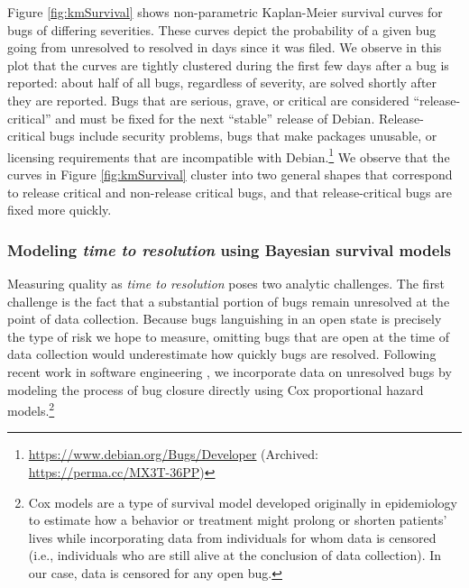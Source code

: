 \documentclass[10pt,conference]{IEEEtran}\usepackage[]{graphicx}\usepackage[usenames,dvipsnames]{color}
\begin{document}
Figure \ref{fig:kmSurvival} shows non-parametric Kaplan-Meier survival curves for bugs of differing severities. These curves depict the probability of a given bug going from unresolved to resolved in days since it was filed.
We observe in this plot that the curves are tightly clustered during the first few days after a bug is reported: about half of all bugs, regardless of severity, are solved shortly after they are reported.
Bugs that are serious, grave, or critical are considered ``release-critical'' and must be fixed for the next ``stable'' release of Debian. Release-critical bugs include security problems, bugs that make packages unusable, or licensing requirements that are incompatible with Debian.\footnote{\url{https://www.debian.org/Bugs/Developer} (Archived: \url{https://perma.cc/MX3T-36PP})} 
We observe that the curves in Figure \ref{fig:kmSurvival} cluster into two general shapes that correspond to release critical and non-release critical bugs, and that release-critical bugs are fixed more quickly. 

\subsubsection*{Modeling \textit{time to resolution} using Bayesian survival models}

Measuring quality as \textit{time to resolution} poses two analytic challenges. The first challenge is the fact that a substantial portion of bugs remain unresolved at the point of data collection. Because bugs languishing in an open state is precisely the type of risk we hope to measure, omitting bugs that are open at the time of data collection would underestimate how quickly bugs are resolved. Following recent work in software engineering \cite{abou_khalil_longitudinal_2019}, we incorporate data on unresolved bugs by modeling the process of bug closure directly using Cox proportional hazard models.\footnote{Cox models are a type of survival model developed originally in epidemiology to estimate how a behavior or treatment might prolong or shorten patients' lives while incorporating data from individuals for whom data is censored (i.e., individuals who are still alive at the conclusion of data collection). In our case, data is censored for any open bug.} %
\end{document}
